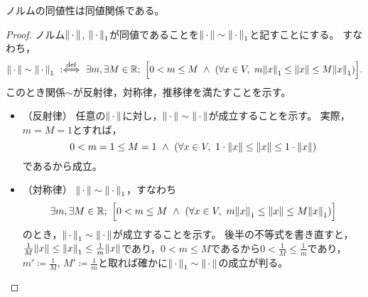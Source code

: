 \documentclass[b5paper,draft,oneside,openany]{ltjsbook} %
\begin{document}
\begin{prop}
    ノルムの同値性は同値関係である。
    \begin{proof}
        ノルム$\norm{\dummy}$, $\norm{\dummy}_1$が同値であることを$\norm{\dummy}\sim\norm{\dummy}_1$と記すことにする。
        すなわち，
        \begin{equation}
            \norm{\dummy}\sim\norm{\dummy}_1\ \defarrow\ \exists m, \exists M\in\R;\ \bsqu{0<m\leq M\ \land \ \pare{
                \forall x\in V,\ m\norm{x}_1 \leq \norm{x} \leq M\norm{x}_1
            }}.
        \end{equation}
        このとき関係$\sim$が反射律，対称律，推移律を満たすことを示す。
        \begin{itemize}
            \item （反射律）
            任意の$\norm{\dummy}$に対し，$\norm{\dummy}\sim\norm{\dummy}$が成立することを示す。
            実際，$m=M=1$とすれば，
            \begin{equation}
                0<m=1\leq M=1\ \land\ \pare{\forall x\in V,\ 1\cdot \norm{x}\leq \norm{x}\leq 1\cdot \norm{x}}
            \end{equation}
            であるから成立。

            \item （対称律）
            $\norm{\dummy}\sim\norm{\dummy}_1$，すなわち
            \begin{equation}
                \exists m, \exists M\in\R;\ \bsqu{0<m\leq M\ \land \ \pare{
                \forall x\in V,\ m\norm{x}_1 \leq \norm{x} \leq M\norm{x}_1
                }}
            \end{equation}
            のとき，$\norm{\dummy}_1\sim\norm{\dummy}$が成立することを示す。
            後半の不等式を書き直すと，$\frac{1}{M}\norm{x}\leq \norm{x}_1\leq \frac{1}{m}\norm{x}$であり，$0<m\leq M$であるから$0<\frac{1}{M}\leq \frac{1}{m}$であり，$m' \coloneqq \frac{1}{M}$, $M' \coloneqq  \frac{1}{m}$と取れば確かに$\norm{\dummy}_1\sim\norm{\dummy}$の成立が判る。


\end{itemize}
\end{proof}
\end{prop}
\end{document}
